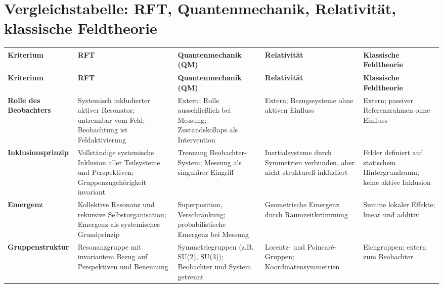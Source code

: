\documentclass[12pt]{iopart}
\begin{document}
\section*{Vergleichstabelle: RFT, Quantenmechanik, Relativität, klassische Feldtheorie}

\renewcommand{\arraystretch}{1.3}
\begin{center}
	\begin{longtable}{|p{4cm}|p{3cm}|p{3cm}|p{3cm}|p{3cm}|}
		\hline
		\textbf{Kriterium} & \textbf{RFT} & \textbf{Quantenmechanik (QM)} & \textbf{Relativität} & \textbf{Klassische Feldtheorie} \\
		\hline
		\endfirsthead
		
		\hline
		\textbf{Kriterium} & \textbf{RFT} & \textbf{Quantenmechanik (QM)} & \textbf{Relativität} & \textbf{Klassische Feldtheorie} \\
		\hline
		\endhead
		
		\hline
		\endfoot
		
		\hline
		\endlastfoot
		
		\textbf{Rolle des Beobachters} & Systemisch inkludierter aktiver Resonator; untrennbar vom Feld; Beobachtung ist Feldaktivierung & Extern; Rolle ausschließlich bei Messung; Zustandskollaps als Intervention & Extern; Bezugssysteme ohne aktiven Einfluss & Extern; passiver Referenzrahmen ohne Einfluss \\
		\hline
		
		\textbf{Inklusionsprinzip} & Vollständige systemische Inklusion aller Teilsysteme und Perspektiven; Gruppenzugehörigkeit invariant & Trennung Beobachter-System; Messung als singulärer Eingriff & Inertialsysteme durch Symmetrien verbunden, aber nicht strukturell inkludiert & Felder definiert auf statischem Hintergrundraum; keine aktive Inklusion \\
		\hline
		
		\textbf{Emergenz} & Kollektive Resonanz und rekursive Selbstorganisation; Emergenz als systemisches Grundprinzip & Superposition, Verschränkung; probabilistische Emergenz bei Messung & Geometrische Emergenz durch Raumzeitkrümmung & Summe lokaler Effekte; linear und additiv \\
		\hline
		
		\textbf{Gruppenstruktur} & Resonanzgruppe mit invariantem Bezug auf Perspektiven und Benennung & Symmetriegruppen (z.B. SU(2), SU(3)); Beobachter und System getrennt & Lorentz- und Poincaré-Gruppen; Koordinatensymmetrien & Eichgruppen; extern zum Beobachter \\
		\hline
		

\end{longtable}
\end{center}
\end{document}
